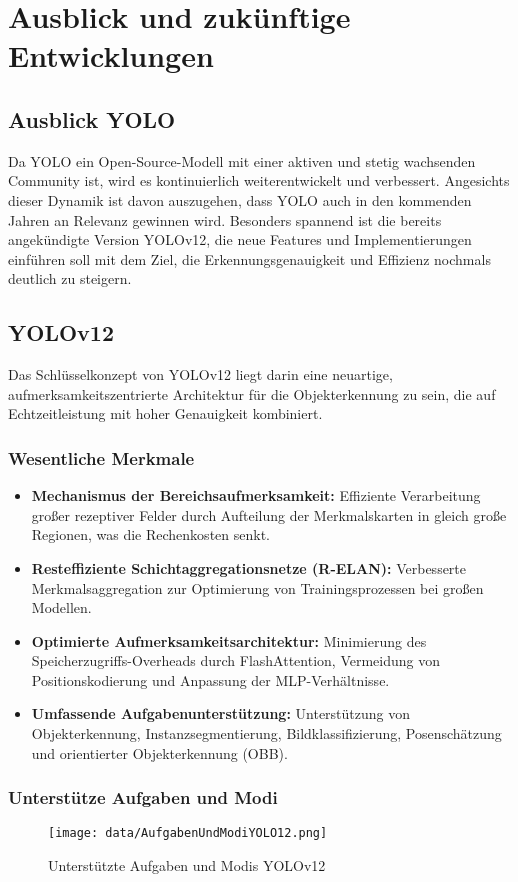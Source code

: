 \section{Ausblick und zukünftige Entwicklungen}
\subsection{Ausblick YOLO}
Da YOLO ein Open-Source-Modell mit einer aktiven und stetig wachsenden Community ist, wird es kontinuierlich weiterentwickelt und verbessert. Angesichts dieser Dynamik ist davon auszugehen, dass YOLO auch in den kommenden Jahren an Relevanz gewinnen wird. Besonders spannend ist die bereits angekündigte Version YOLOv12, die neue Features und Implementierungen einführen soll mit dem Ziel, die Erkennungsgenauigkeit und Effizienz nochmals deutlich zu steigern.
\subsection{YOLOv12}
Das Schlüsselkonzept von YOLOv12 liegt darin eine neuartige, aufmerksamkeitszentrierte Architektur für die Objekterkennung zu sein, die auf Echtzeitleistung mit hoher Genauigkeit kombiniert. \cite{Jocher2025YOLO12}
\subsubsection{Wesentliche Merkmale}
\begin{itemize}
    \item \textbf{Mechanismus der Bereichsaufmerksamkeit:} Effiziente Verarbeitung großer rezeptiver Felder durch Aufteilung der Merkmalskarten in gleich große Regionen, was die Rechenkosten senkt.
    \item \textbf{Resteffiziente Schichtaggregationsnetze (R-ELAN):} Verbesserte Merkmalsaggregation zur Optimierung von Trainingsprozessen bei großen Modellen.
    \item \textbf{Optimierte Aufmerksamkeitsarchitektur:} Minimierung des Speicherzugriffs-Overheads durch FlashAttention, Vermeidung von Positionskodierung und Anpassung der MLP-Verhältnisse.
    \item \textbf{Umfassende Aufgabenunterstützung:} Unterstützung von Objekterkennung, Instanzsegmentierung, Bildklassifizierung, Posenschätzung und orientierter Objekterkennung (OBB).
\end{itemize}
\subsubsection{Unterstütze Aufgaben und Modi}
\begin{figure}[ht]
    \centering
    \texttt{[image: data/AufgabenUndModiYOLO12.png]}
    \caption{Unterstützte Aufgaben und Modis YOLOv12}
    \label{fig:YOLOv12_unterstützte_Modi}
\end{figure}
